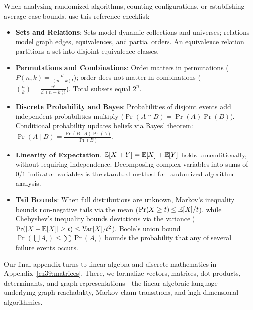 When analyzing randomized algorithms, counting configurations, or establishing
average-case bounds, use this reference checklist:
\begin{itemize}
  \item \textbf{Sets and Relations}: Sets model dynamic collections and universes;
    relations model graph edges, equivalences, and partial orders. An equivalence
    relation partitions a set into disjoint equivalence classes.
  \item \textbf{Permutations and Combinations}: Order matters in permutations
    ($P(n,k) = \frac{n!}{(n-k)!}$); order does not matter in combinations
    ($\binom{n}{k} = \frac{n!}{k!(n-k)!}$). Total subsets equal $2^n$.
  \item \textbf{Discrete Probability and Bayes}: Probabilities of disjoint events
    add; independent probabilities multiply ($\Pr(A \cap B) = \Pr(A)\Pr(B)$).
    Conditional probability updates beliefs via Bayes' theorem:
    $\Pr(A \mid B) = \frac{\Pr(B \mid A)\Pr(A)}{\Pr(B)}$.
  \item \textbf{Linearity of Expectation}: $\mathbb{E}[X+Y] = \mathbb{E}[X] + \mathbb{E}[Y]$ holds
    unconditionally, without requiring independence. Decomposing complex variables
    into sums of $0/1$ indicator variables is the standard method for randomized
    algorithm analysis.
  \item \textbf{Tail Bounds}: When full distributions are unknown, Markov's
    inequality bounds non-negative tails via the mean ($\Pr(X \ge t) \le \mathbb{E}[X]/t$),
    while Chebyshev's inequality bounds deviations via the variance
    ($\Pr(|X-\mathbb{E}[X]| \ge t) \le \operatorname{Var}[X]/t^2$). Boole's union bound
    $\Pr(\bigcup A_i) \le \sum \Pr(A_i)$ bounds the probability that any of several
    failure events occurs.
\end{itemize}

Our final appendix turns
to linear algebra and discrete mathematics in Appendix~\ref{ch39:matrices}.
There, we formalize vectors, matrices, dot products, determinants, and graph
representations---the linear-algebraic language underlying graph reachability,
Markov chain transitions, and high-dimensional algorithmics.

